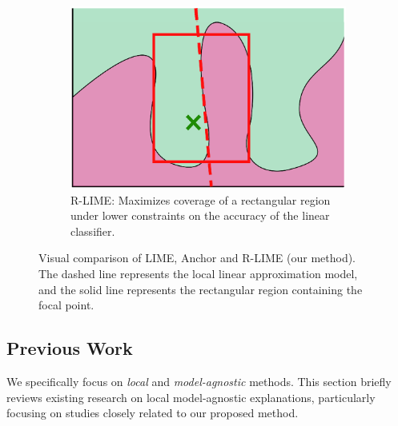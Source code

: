 \documentclass[runningheads]{llncs}
\begin{document}
\begin{figure}[tbp]
\begin{subfigure}[t]{0.3\textwidth}
{    }\label{fig:anchor}
  \end{subfigure}
  \hspace{0.03\textwidth}
  \begin{subfigure}[t]{0.3\textwidth}
    \centering
    \includegraphics[width=\textwidth]{src/img/visual-rlime3}
    \caption{%
      R-LIME\@:
      Maximizes coverage of a rectangular region
      under lower constraints on the accuracy of the linear classifier.
    }\label{fig:rlime}
  \end{subfigure}
  \caption[Visual comparison of LIME, Anchor and R-LIME]{%
    Visual comparison of LIME, Anchor and R-LIME (our method).
    The dashed line represents the local linear approximation model,
    and the solid line represents the rectangular region containing the focal point.
  }
\end{figure}

\subsection{Previous Work}
We specifically focus on \emph{local} and \emph{model-agnostic} methods.
This section briefly reviews existing research on local model-agnostic explanations,
particularly focusing on studies closely related to our proposed method.
\end{document}
